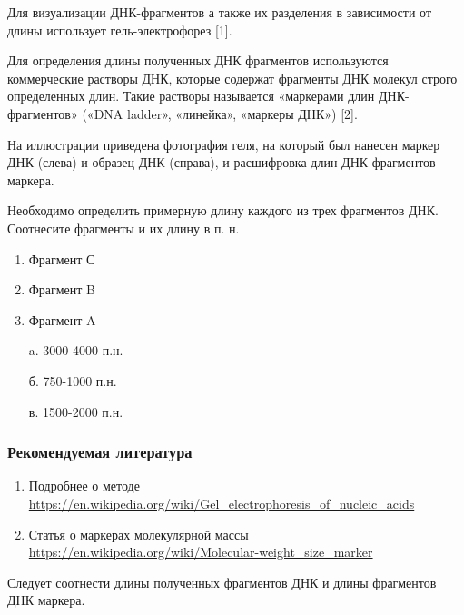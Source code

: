 
Для визуализации ДНК-фрагментов а также их разделения в зависимости от длины использует гель-электрофорез [1].

Для определения длины полученных ДНК фрагментов используются коммерческие растворы ДНК, которые содержат фрагменты ДНК молекул строго определенных длин. Такие растворы называется «маркерами длин ДНК-фрагментов» («DNA ladder», «линейка», «маркеры ДНК») [2].

На иллюстрации приведена фотография геля, на который был нанесен маркер ДНК (слева) и образец ДНК (справа), и расшифровка длин ДНК фрагментов маркера.


Необходимо определить примерную длину каждого из трех фрагментов ДНК. Соотнесите фрагменты и их длину в п. н.

\begin{multicols}{2}
    {
        \begin{enumerate}
            \item Фрагмент С
            \item Фрагмент B
            \item Фрагмент A
        \end{enumerate}
    }
    {
        \begin{enumerate}
            \item[a.] 3000-4000 п.н.
            \item[б.] 750-1000 п.н.
            \item[в.] 1500-2000 п.н.  
        \end{enumerate}
    }
    
\end{multicols}


\subsubsection*{Рекомендуемая литература}

\begin{enumerate}
    \item Подробнее о методе \url{https://en.wikipedia.org/wiki/Gel_electrophoresis_of_nucleic_acids}
    \item Статья о маркерах молекулярной массы \url{https://en.wikipedia.org/wiki/Molecular-weight_size_marker}
\end{enumerate}

\explanationSection

Следует соотнести длины полученных фрагментов ДНК и длины фрагментов ДНК маркера.

